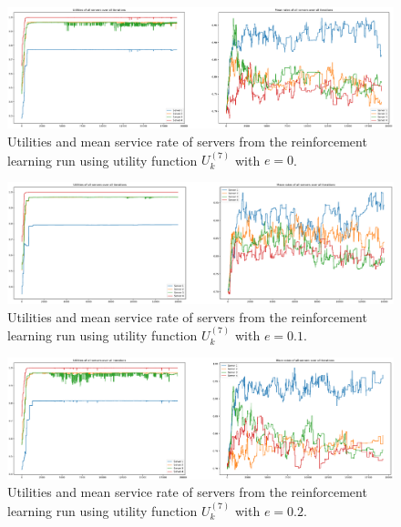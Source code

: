 \begin{figure}[H]
    \includegraphics[width=\textwidth]{chapters/00_appendix/03_more_rl_results/Bin/utility_7_eps/u7_1_e0.eps}
    \caption{Utilities and mean service rate of servers from the reinforcement
    learning run using utility function \(U_k^{(7)}\) with \(e = 0\).}
    \label{fig:RL_utility7_1_e0}
\end{figure}


\begin{figure}[H]
    \includegraphics[width=\textwidth]{chapters/00_appendix/03_more_rl_results/Bin/utility_7_eps/u7_1_e01.eps}
    \caption{Utilities and mean service rate of servers from the reinforcement
    learning run using utility function \(U_k^{(7)}\) with \(e = 0.1\).}
    \label{fig:RL_utility7_1_e01}
\end{figure}


\begin{figure}[H]
    \includegraphics[width=\textwidth]{chapters/00_appendix/03_more_rl_results/Bin/utility_7_eps/u7_1_e02.eps}
    \caption{Utilities and mean service rate of servers from the reinforcement
    learning run using utility function \(U_k^{(7)}\) with \(e = 0.2\).}
    \label{fig:RL_utility7_1_e02}
\end{figure}


